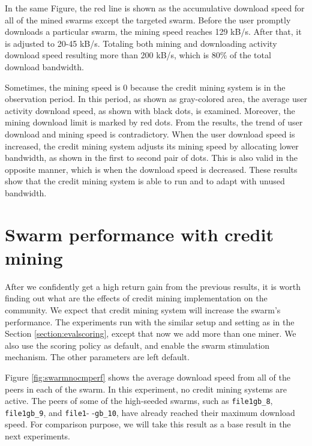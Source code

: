In the same Figure, the red line is shown as the accumulative download speed for all of the mined swarms except the targeted swarm. Before the user promptly downloads a particular swarm, the mining speed reaches 129 kB/s. After that, it is adjusted to 20-45 kB/s. Totaling both mining and downloading activity download speed resulting more than 200 kB/s, which is 80\% of the total download bandwidth. 

Sometimes, the mining speed is 0 because the credit mining system is in the observation period. In this period, as shown as gray-colored area, the average user activity download speed, as shown with black dots, is examined. Moreover, the mining download limit is marked by red dots. From the results, the trend of user download and mining speed is contradictory. When the user download speed is increased, the credit mining system adjusts its mining speed by allocating lower bandwidth, as shown in the first to second pair of dots. This is also valid in the opposite manner, which is when the download speed is decreased. These results show that the credit mining system is able to run and to adapt with unused bandwidth. 
\vspace{-0.3cm} 
\section{Swarm performance with credit mining}
\label{section:swperf}
After we confidently get a high return gain from the previous results, it is worth finding out what are the effects of credit mining implementation on the community. We expect that credit mining system will increase the swarm's performance. The experiments run with the similar setup and setting as in the Section \ref{section:evalscoring}, except that now we add more than one miner. We also use the scoring policy as default, and enable the swarm stimulation mechanism. The other parameters are left default. 

Figure \ref{fig:swarmnocmperf} shows the average download speed from all of the peers in each of the swarm. In this experiment, no credit mining systems are active. The peers of some of the high-seeded swarms, such as \texttt{file1gb\_8}, \texttt{file1gb\_9}, and \texttt{file1}- -\texttt{gb\_10}, have already reached their maximum download speed. For comparison purpose, we will take this result as a base result in the next experiments.

